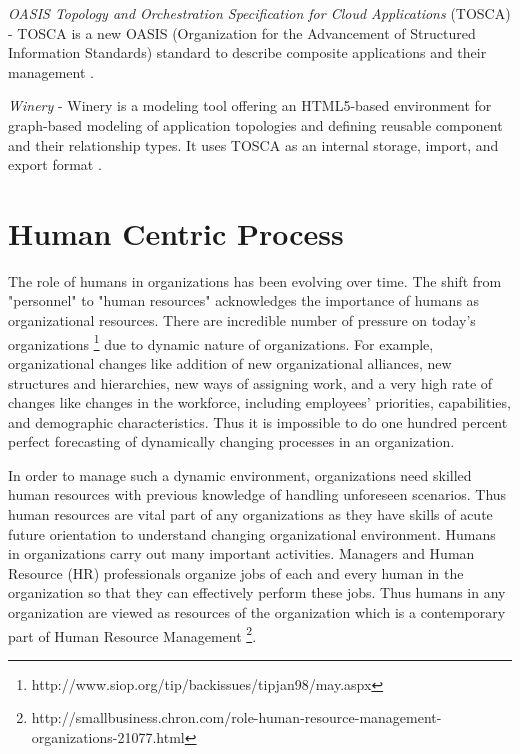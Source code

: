 \textit{OASIS Topology and Orchestration Specification for Cloud Applications} (TOSCA) - TOSCA  is  a  new  OASIS (Organization for the Advancement of Structured Information Standards)  standard  to  describe  composite applications  and  their  management \cite{Kopp2013}.  

\textit{Winery} - Winery is a modeling tool offering an HTML5-based environment for graph-based modeling of application topologies and defining reusable component and their relationship types. It uses TOSCA as an internal storage, import, and export format \cite{Kopp2013}. 

\section{Human Centric Process}
\label{sec:humancentric}
The role of humans in organizations has been evolving over time. The shift from "personnel" to "human resources" acknowledges the importance of humans as organizational resources. There are incredible number of pressure on today's organizations \footnote{http://www.siop.org/tip/backissues/tipjan98/may.aspx} due to dynamic nature of organizations. For example, organizational changes like addition of new organizational alliances, new structures and hierarchies, new ways of assigning work, and a very high rate of changes like changes in the workforce, including employees' priorities, capabilities, and demographic characteristics. Thus it is impossible to do one hundred percent perfect forecasting of dynamically changing processes in an organization.

In order to manage such a dynamic environment, organizations need skilled human resources with previous knowledge of handling unforeseen scenarios. Thus human resources are vital part of any organizations as they have skills of acute future orientation to understand changing organizational environment. Humans in organizations carry out many important activities. Managers and Human Resource (HR) professionals organize jobs of each and every human in the organization so that they can effectively perform these jobs. Thus humans in any organization are viewed as resources of the organization which is a contemporary part of Human Resource Management \footnote{http://smallbusiness.chron.com/role-human-resource-management-organizations-21077.html}.

